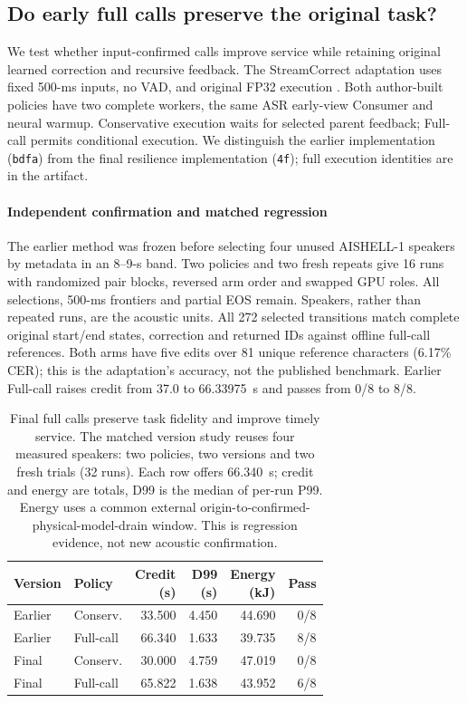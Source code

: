 \subsection{Do early full calls preserve the original task?}
\label{subsec:native_retention_eval}
We test whether input-confirmed calls improve service while retaining
original learned correction and recursive feedback. The StreamCorrect
adaptation uses fixed 500-ms inputs, no VAD, and original FP32 execution
\cite{vu2026streamcorrect}. Both author-built policies have two complete
workers, the same ASR early-view Consumer and neural warmup. Conservative
execution waits for selected parent feedback; Full-call permits conditional
execution. We distinguish the earlier implementation (\texttt{bdfa}) from
the final resilience implementation (\texttt{4f}); full execution identities
are in the artifact.

\paragraph{Independent confirmation and matched regression}
The earlier method was frozen before selecting four unused AISHELL-1
speakers~\cite{bu2017aishell} by metadata in an 8--9-s band. Two policies
and two fresh repeats give 16 runs with randomized pair blocks, reversed
arm order and swapped GPU roles. All selections, 500-ms frontiers and
partial EOS remain. Speakers, rather than repeated runs, are the acoustic
units. All 272 selected transitions match complete original start/end
states, correction and returned IDs against offline full-call references.
Both arms have five edits over 81 unique reference characters (6.17\%
CER); this is the adaptation's accuracy, not the published benchmark.
Earlier Full-call raises credit from 37.0 to 66.33975~s and passes
from 0/8 to 8/8.

\begin{table}[t]
\centering
\caption{Final full calls preserve task fidelity and improve timely
service. The matched version study reuses four measured speakers:
two policies, two versions and two fresh trials (32 runs). Each row offers
66.340~s; credit and energy are totals, D99 is the median of per-run P99.
Energy uses a common external origin-to-confirmed-physical-model-drain
window. This is regression evidence, not new acoustic confirmation.}
\label{tab:native_full_confirm}
\small\setlength{\tabcolsep}{2.5pt}
\begin{tabular}{@{}llrrrr@{}}
\toprule
Version & Policy & \shortstack{Credit\\(s)} & \shortstack{D99\\(s)} &
\shortstack{Energy\\(kJ)} & Pass\\
\midrule
Earlier & Conserv. & 33.500 & 4.450 & 44.690 & 0/8\\
Earlier & Full-call & 66.340 & 1.633 & 39.735 & 8/8\\
Final & Conserv. & 30.000 & 4.759 & 47.019 & 0/8\\
Final & Full-call & 65.822 & 1.638 & 43.952 & 6/8\\
\bottomrule
\end{tabular}
\end{table}


